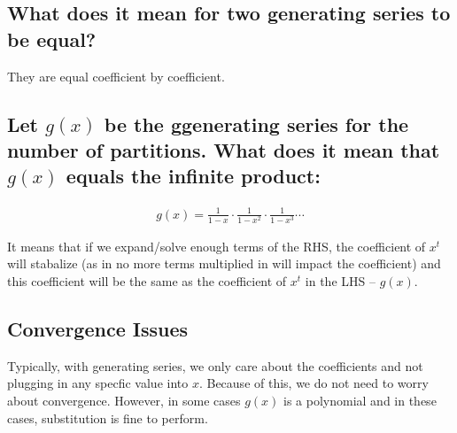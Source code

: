 \documentclass{report}
\begin{document}

\subsection*{What does it mean for two generating series to be equal?}

They are equal coefficient by coefficient.

\subsection*{Let $g(x)$ be the ggenerating series for the number of partitions.
    What does it mean that $g(x)$ equals the infinite product:
}

\begin{align*}
    g(x) = \frac{1}{1 - x} \cdot \frac{1}{1 - x^{2}} \cdot \frac{1}{1 - x^{3}} \cdots
\end{align*}

It means that if we expand/solve enough terms of the RHS, the coefficient
of $x^t$ will stabalize (as in no more terms multiplied in will impact
the coefficient) and this coefficient will be the same as the coefficient
of $x^t$ in the LHS -- $g(x)$.

\subsection*{Convergence Issues}

Typically, with generating series, we only care about the coefficients and
not plugging in any specfic value into $x$. Because of this, we do not need
to worry about convergence. However, in some cases $g(x)$ is a polynomial
and in these cases, substitution is fine to perform.
\end{document}
